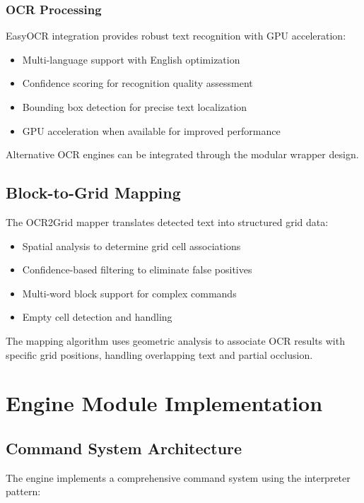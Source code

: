 \subsubsection{OCR Processing}

EasyOCR integration provides robust text recognition with GPU acceleration:

\begin{itemize}
    \item Multi-language support with English optimization
    \item Confidence scoring for recognition quality assessment
    \item Bounding box detection for precise text localization
    \item GPU acceleration when available for improved performance
\end{itemize}

Alternative OCR engines can be integrated through the modular wrapper design.

\subsection{Block-to-Grid Mapping}

The OCR2Grid mapper translates detected text into structured grid data:

\begin{itemize}
    \item Spatial analysis to determine grid cell associations
    \item Confidence-based filtering to eliminate false positives
    \item Multi-word block support for complex commands
    \item Empty cell detection and handling
\end{itemize}

The mapping algorithm uses geometric analysis to associate OCR results with specific grid positions, handling overlapping text and partial occlusion.

\section{Engine Module Implementation}

\subsection{Command System Architecture}

The engine implements a comprehensive command system using the interpreter pattern:

